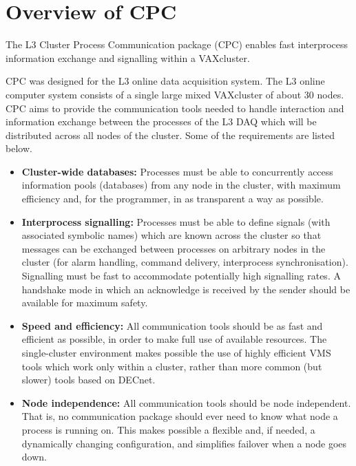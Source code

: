 \newpage
\tableofcontents

\newpage

\part{Overview of CPC}

The L3 Cluster Process Communication package (CPC) enables fast interprocess
information exchange and signalling within a VAXcluster.

CPC was designed for the L3 online data acquisition system. The L3 online
computer system consists
of a single large mixed VAXcluster of about 30 nodes.
CPC aims to provide the communication
tools needed to handle interaction and
information exchange between the  processes of the L3 DAQ
which will be distributed across all nodes of the cluster. 
Some of the requirements are listed below.

\begin{itemize}

\item{ \bf Cluster-wide databases: }
Processes must be able to concurrently access
information pools (databases) from any node in the cluster,
with maximum efficiency
and, for the programmer, in as transparent a way as possible.

\item{\bf Interprocess signalling: }
Processes must be able to define signals (with associated symbolic names)
which are
known across the cluster so that messages can be exchanged between
processes on arbitrary nodes in the cluster (\eg for alarm handling,
command delivery, interprocess synchronisation). Signalling must be
fast to accommodate potentially high signalling rates. A handshake mode
in which an acknowledge is received by the sender should be available
for maximum safety.

\item{\bf Speed and efficiency: }
All communication tools should be as fast and efficient as possible,
in order to make full use of available resources.
The single-cluster environment makes possible the use of highly efficient
VMS tools which work only within a cluster, rather than more common
(but slower) tools based on DECnet.

\item{\bf Node independence: }
All communication tools should be node independent. That is, no
communication package should ever need to know what node a process is
running on. 
This makes possible a flexible and, if needed, a dynamically changing
configuration, and simplifies failover when a node goes down.


\end{itemize}

